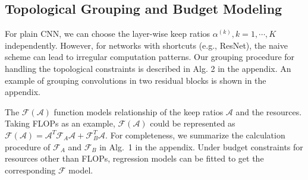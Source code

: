 \documentclass[runningheads]{llncs}
\newcommand{\flops}{\mathcal{F}}
\newcommand{\alphas}{\mathcal{A}}
\begin{document}
  
  
  
  \subsection{Topological Grouping and Budget Modeling}
  \label{sec:method-grouping}
  
  
  For plain CNN, we can choose the layer-wise keep ratios $\alpha^{(k)}, k=1,\cdots,K$ independently. However, for networks with shortcuts (e.g., ResNet), the naive scheme can lead to irregular computation patterns. 
  Our grouping procedure for handling the topological constraints is described in Alg. 2 in the appendix. An example of grouping convolutions in two residual blocks is shown in the appendix.
  
  The $\flops(\alphas)$ function models relationship of the keep ratios $\alphas$ and the resources. Taking FLOPs as an example, $\flops(\alphas)$ could be represented as $\flops(\alphas) = \alphas^T \flops_A \alphas + \flops_B^T \alphas$. 
  For completeness, we summarize the calculation procedure of $\flops_A$ and $\flops_B$ in Alg.~1 in the appendix. 
  Under budget constraints for resources other than FLOPs, regression models can be fitted to get the corresponding $\flops$ model.
  
  
  
\end{document}

